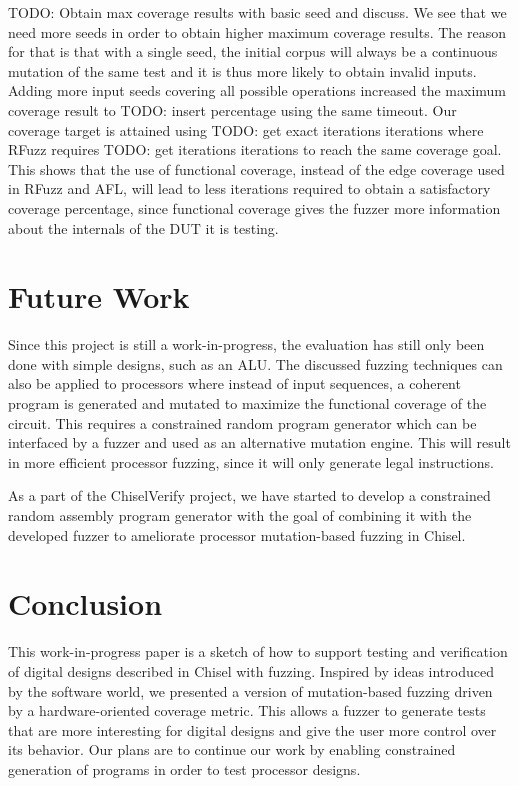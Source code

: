 \documentclass[conference]{IEEEtran}
\newcommand{\todo}[1]{{\color{olive} TODO: #1}}
\begin{document}
\todo{Obtain max coverage results with basic seed and discuss.}
We see that we need more seeds in order to obtain higher maximum coverage results.
The reason for that is that with a single seed, the initial corpus will always be a continuous mutation of the same test and it is thus more likely to obtain invalid inputs.
Adding more input seeds covering all possible operations increased the maximum coverage result to \todo{insert percentage} using the same timeout.
Our coverage target is attained using \todo{get exact iterations} iterations where RFuzz requires \todo{get iterations} iterations to reach the same coverage goal.
This shows that the use of functional coverage, instead of the edge coverage used in RFuzz and AFL, will lead to less iterations required to obtain a satisfactory coverage percentage, since functional coverage gives the fuzzer more information about the internals of the DUT it is testing.

\section{Future Work}
Since this project is still a work-in-progress, the evaluation has still only been done with simple designs, such as an ALU.
The discussed fuzzing techniques can also be applied to processors where instead of input sequences, a coherent program is generated and mutated to maximize the functional coverage of the circuit. 
This requires a constrained random program generator which can be interfaced by a fuzzer and used as an alternative mutation engine.
This will result in more efficient processor fuzzing, since it will only generate legal instructions. 

As a part of the ChiselVerify project, we have started to develop a constrained random assembly program generator with the goal of combining it with the developed fuzzer to ameliorate processor mutation-based fuzzing in Chisel.

\section{Conclusion}
\label{sec:conclusion}

This work-in-progress paper is a sketch of how to support testing and verification
of digital designs described in Chisel with fuzzing. 
Inspired by ideas introduced by the software world, we presented a version of mutation-based fuzzing driven by a hardware-oriented coverage metric.
This allows a fuzzer to generate tests that are more interesting for digital designs and give the user more control over its behavior. 
Our plans are to continue our work by enabling constrained generation of programs in order to test processor designs.
\end{document}
